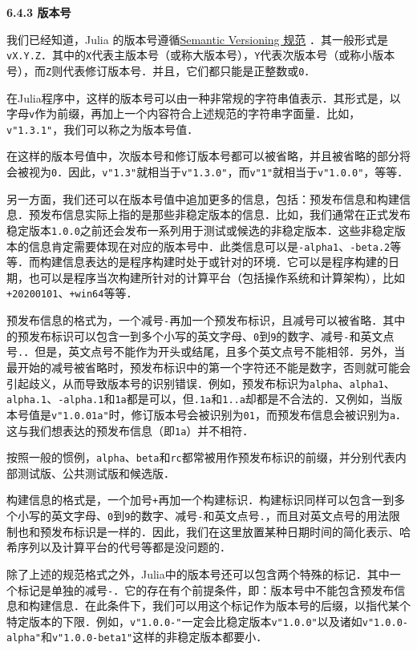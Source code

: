 \textbf{6.4.3 版本号}

我们已经知道，Julia 的版本号遵循\href{https://semver.org}{Semantic Versioning 规范} ．其一般形式是\verb|vX.Y.Z|．其中的\verb|X|代表主版本号（或称大版本号），\verb|Y|代表次版本号（或称小版本号），而\verb|Z|则代表修订版本号．并且，它们都只能是正整数或\verb|0|．

在Julia程序中，这样的版本号可以由一种非常规的字符串值表示．其形式是，以字母\verb|v|作为前缀，再加上一个内容符合上述规范的字符串字面量．比如，\verb|v"1.3.1"|，我们可以称之为版本号值．

在这样的版本号值中，次版本号和修订版本号都可以被省略，并且被省略的部分将会被视为\verb|0|．因此，\verb|v"1.3"|就相当于\verb|v"1.3.0"|，而\verb|v"1"|就相当于\verb|v"1.0.0"|，等等．

另一方面，我们还可以在版本号值中追加更多的信息，包括：预发布信息和构建信息．预发布信息实际上指的是那些非稳定版本的信息．比如，我们通常在正式发布稳定版本\verb|1.0.0|之前还会发布一系列用于测试或候选的非稳定版本．这些非稳定版本的信息肯定需要体现在对应的版本号中．此类信息可以是\verb|-alpha1|、\verb|-beta.2|等等．而构建信息表达的是程序构建时处于或针对的环境．它可以是程序构建的日期，也可以是程序当次构建所针对的计算平台（包括操作系统和计算架构），比如\verb|+20200101|、\verb|+win64|等等．

预发布信息的格式为，一个减号\verb|-|再加一个预发布标识，且减号可以被省略．其中的预发布标识可以包含一到多个小写的英文字母、\verb|0|到\verb|9|的数字、减号\verb|-|和英文点号\verb|.|．但是，英文点号不能作为开头或结尾，且多个英文点号不能相邻．另外，当最开始的减号被省略时，预发布标识中的第一个字符还不能是数字，否则就可能会引起歧义，从而导致版本号的识别错误．例如，预发布标识为\verb|alpha|、\verb|alpha1|、\verb|alpha.1|、\verb|-alpha.1|和\verb|1a|都是可以，但\verb|.1a|和\verb|1..a|却都是不合法的．又例如，当版本号值是\verb|v"1.0.01a"|时，修订版本号会被识别为\verb|01|，而预发布信息会被识别为\verb|a|．这与我们想表达的预发布信息（即\verb|1a|）并不相符．

按照一般的惯例，\verb|alpha|、\verb|beta|和\verb|rc|都常被用作预发布标识的前缀，并分别代表内部测试版、公共测试版和候选版．

构建信息的格式是，一个加号\verb|+|再加一个构建标识．构建标识同样可以包含一到多个小写的英文字母、\verb|0|到\verb|9|的数字、减号\verb|-|和英文点号\verb|.|，而且对英文点号的用法限制也和预发布标识是一样的．因此，我们在这里放置某种日期时间的简化表示、哈希序列以及计算平台的代号等都是没问题的．

除了上述的规范格式之外，Julia中的版本号还可以包含两个特殊的标记．其中一个标记是单独的减号\verb|-|．它的存在有个前提条件，即：版本号中不能包含预发布信息和构建信息．在此条件下，我们可以用这个标记作为版本号的后缀，以指代某个特定版本的下限．例如，\verb|v"1.0.0-"|一定会比稳定版本\verb|v"1.0.0"|以及诸如\verb|v"1.0.0-alpha"|和\verb|v"1.0.0-beta1"|这样的非稳定版本都要小．

